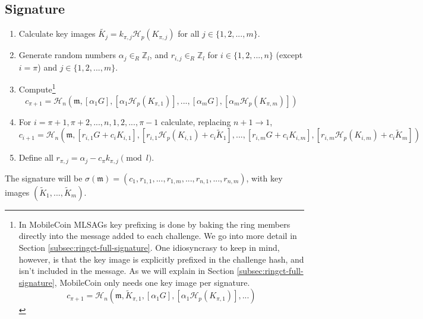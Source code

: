 \subsection*{Signature}

\begin{enumerate}
	\item Calculate key images \(\tilde{K_j} = k_{\pi, j} \mathcal{H}_p(K_{\pi, j})\) for all \(j \in \{1, 2, ..., m\}\).

	\item Generate random numbers  \(\alpha_j \in_R \mathbb{Z}_l\), and \(r_{i, j} \in_R \mathbb{Z}_l\) for \(i \in \{1, 2, ..., n\}\) (except \(i = \pi\)) and \(j \in \{1, 2, ..., m\}\).

	\item Compute\footnote{\label{footnote:mobilecoin-challenge-ideosyncracies}In MobileCoin MLSAGs key prefixing is done by baking the ring members directly into the message added to each challenge. We go into more detail in Section \ref{subsec:ringct-full-signature}. One idiosyncrasy to keep in mind, however, is that the key image is explicitly prefixed in the challenge hash, and isn't included in the message. As we will explain in Section \ref{subsec:ringct-full-signature}, MobileCoin only needs one key image per signature.\vspace{-.15cm}
	\[c_{\pi+1} = \mathcal{H}_n(\mathfrak{m}, \tilde{K}_{\pi, 1}, [\alpha_1 G], [\alpha_1 \mathcal{H}_p(K_{\pi, 1})], ...)
	\]}
	\[c_{\pi+1} = \mathcal{H}_n(\mathfrak{m}, [\alpha_1 G], [\alpha_1 \mathcal{H}_p(K_{\pi, 1})], ..., [\alpha_m G], [\alpha_m \mathcal{H}_p(K_{\pi, m})])\]

	\item For \(i = \pi+1, \pi+2, ..., n, 1, 2, ..., \pi-1\) calculate, replacing \(n + 1 \rightarrow 1\),\vspace{.175cm}
	\[ c_{i+1} = \mathcal{H}_n(\mathfrak{m}, [r_{i, 1} G + c_i K_{i, 1}], [r_{i, 1} \mathcal{H}_p(K_{i, 1}) + c_i \tilde{K}_1], 
	..., [r_{i, m} G + c_i K_{i, m}], [r_{i, m} \mathcal{H}_p(K_{i, m}) + c_i \tilde{K}_m])\]

	\item Define all \(r_{\pi, j} = \alpha_j - c_\pi k_{\pi, j} \pmod l\).
\end{enumerate}

The signature will be \(\sigma(\mathfrak{m}) = (c_1, r_{1, 1}, ..., r_{1, m}, ..., r_{n, 1}, ..., r_{n, m}) \), with key images $(\tilde{K}_1, ...,  \tilde{K}_m)$.

